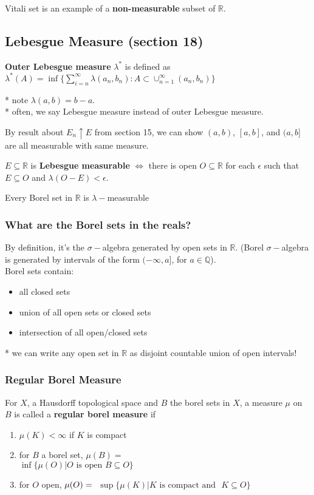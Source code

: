 \documentclass[a4paper, 12pt]{article}
\def\R{\ensuremath{\mathbb{R}}} %
\def\Q{\ensuremath{\mathbb{Q}}}
\newcommand{\bt}[1]{\textbf{#1}} %
\begin{document}
\begin{multicols}{2}
Vitali set is an example of a \bt{non-measurable} subset of $\R$.

\subsection{Lebesgue Measure (section 18)}

\bt{Outer Lebesgue measure} $\lambda^*$ is defined as 
$\lambda^*(A) = \inf \{ \sum_{i=n}^\infty \lambda(a_n, b_n) : A \subset \cup_{n=1}^\infty (a_n, b_n)\}$ 

* note $\lambda(a, b) = b - a$.\\
* often, we say Lebesgue measure instead of outer Lebesgue measure. 

By result about $E_n \uparrow E$ from section 15, we can show 
$(a, b)$, $[a, b]$, and $(a, b]$ are all measurable with same measure.

$E \subseteq \R$ is \bt{Lebesgue measurable} $\iff$ there is open $O \subseteq \R$ for each $\epsilon$ such that 
$E \subseteq O$ and $\lambda(O - E) < \epsilon$.

Every Borel set in $\R$ is $\lambda-$measurable

\subsubsection{What are the Borel sets in the reals?}
By definition, it's the $\sigma-$algebra generated by open sets in $\R$.
(Borel $\sigma-$algebra is generated by intervals of the form $(-\infty, a]$, for 
$a \in \Q$). \\
Borel sets contain:
\begin{itemize}
    \item all closed sets 
    \item union of all open sets or closed sets
    \item intersection of all open/closed sets
\end{itemize}

* we can write any open set in $\R$ as disjoint countable union of open intervals!
\subsubsection{Regular Borel Measure}
For $X$, a Hausdorff topological space and $B$ the borel sets in $X$, 
a measure $\mu$ on $B$ is called a \bt{regular borel measure} if 
\begin{enumerate}
    \item $\mu(K) < \infty$ if $K$ is compact 
    \item for $B$ a borel set, $\mu(B) =$\\ $\inf \{\mu(O) | O \text{ is open } B \subseteq O\}$ 
    \item for $O$ open, $\mu(O) = \\$  $\sup\{\mu(K) | K \text{ is compact and }$ $K \subseteq O\}$
\end{enumerate}


\end{multicols}
\end{document}
